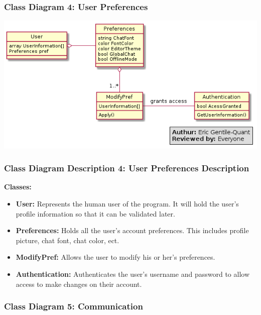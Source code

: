 \documentclass[twoside,letterpaper]{article}
\begin{document}
{\newpage

\subsubsection[Class Diagram 4: User Preferences]{\rmfamily\bfseries\color{black}
	Class Diagram 4: User Preferences}
\hypertarget{RefHeading22059017292}{}
\bigskip

\includegraphics[width=\textwidth]{images/ClassDiagrams/UserPref}

\newpage

\subsubsection[Class Diagram Description 4: User Preferences Description]{\rmfamily\bfseries\color{black}
	Class Diagram Description 4: User Preferences Description}
\hypertarget{RefHeading22059017292}{}

\textbf{Classes:}
\begin{itemize}

       \item \textbf{User:} Represents the human user of the program. It will hold the user's profile information so that it can be validated later.
       \item \textbf{Preferences:} Holds all the user's account preferences. This includes profile picture, chat font, chat color, ect.
       \item \textbf{ModifyPref:} Allows the user to modify his or her's preferences.
       \item \textbf{Authentication:} Authenticates the user's username and password to allow access to make changes on their account.
\end{itemize}

\newpage
\subsubsection[Class Diagram 5: Communication]{\rmfamily\bfseries\color{black}
	Class Diagram 5: Communication}
\hypertarget{RefHeading22059017292}{}
\bigskip

}
\end{document}
